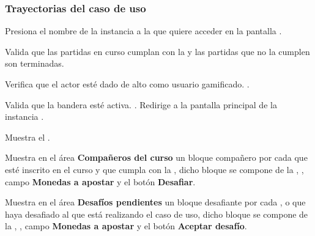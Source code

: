\begin{UseCase}
{	}








\end{UseCase}

\subsubsection{Trayectorias del caso de uso}

\begin{UCtrayectoria}%
%

    \Actor Presiona el nombre de la instancia a la que quiere acceder en la pantalla .

    \Sistema Valida que las partidas en curso cumplan con la  y las partidas que no la cumplen son terminadas.

    \Sistema Verifica que el actor esté dado de alto como usuario gamificado. .

    \Sistema Valida que la bandera  esté activa. .
    \label{CU-C07-mostrar informacion}
    \Sistema Redirige a la pantalla principal de la instancia .

    \Sistema Muestra el .

    \Sistema Muestra en el área {\bf Compañeros del curso} un bloque compañero por cada  que esté inscrito en el curso y que cumpla con la , dicho bloque se compone de la , , campo {\bf Monedas a apostar} y el botón {\bf Desafiar}.

    \Sistema Muestra en el área {\bf Desafíos pendientes} un bloque desafiante por cada ,  o  que haya desafiado al  que está realizando el caso de uso, dicho bloque se compone de la , , campo {\bf Monedas a apostar} y el botón {\bf Aceptar desafío}.

\end{UCtrayectoria}

